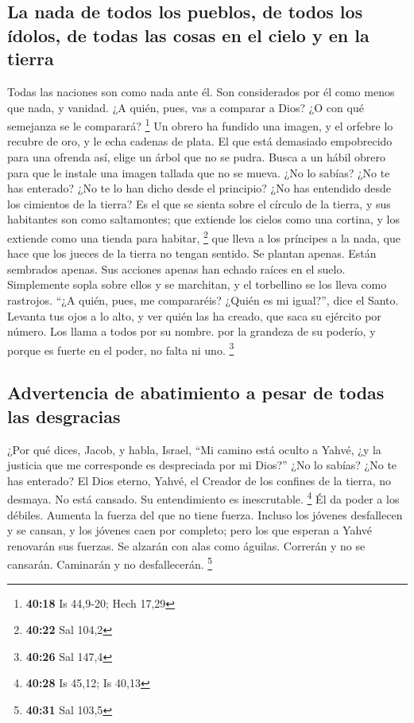 \hypertarget{la-nada-de-todos-los-pueblos-de-todos-los-uxeddolos-de-todas-las-cosas-en-el-cielo-y-en-la-tierra}{%
\subsection{La nada de todos los pueblos, de todos los ídolos, de todas
las cosas en el cielo y en la
tierra}\label{la-nada-de-todos-los-pueblos-de-todos-los-uxeddolos-de-todas-las-cosas-en-el-cielo-y-en-la-tierra}}

 Todas las naciones son como nada ante él. Son
considerados por él como menos que nada, y vanidad.  ¿A
quién, pues, vas a comparar a Dios? ¿O con qué semejanza se le
comparará? \footnote{\textbf{40:18} Is 44,9-20; Hech 17,29}
 Un obrero ha fundido una imagen, y el orfebre lo recubre
de oro, y le echa cadenas de plata.  El que está
demasiado empobrecido para una ofrenda así, elige un árbol que no se
pudra. Busca a un hábil obrero para que le instale una imagen tallada
que no se mueva.  ¿No lo sabías? ¿No te has enterado? ¿No
te lo han dicho desde el principio? ¿No has entendido desde los
cimientos de la tierra?  Es el que se sienta sobre el
círculo de la tierra, y sus habitantes son como saltamontes; que
extiende los cielos como una cortina, y los extiende como una tienda
para habitar, \footnote{\textbf{40:22} Sal 104,2}  que
lleva a los príncipes a la nada, que hace que los jueces de la tierra no
tengan sentido.  Se plantan apenas. Están sembrados
apenas. Sus acciones apenas han echado raíces en el suelo. Simplemente
sopla sobre ellos y se marchitan, y el torbellino se los lleva como
rastrojos.  ``¿A quién, pues, me compararéis? ¿Quién es
mi igual?'', dice el Santo.  Levanta tus ojos a lo alto,
y ver quién las ha creado, que saca su ejército por número. Los llama a
todos por su nombre. por la grandeza de su poderío, y porque es fuerte
en el poder, no falta ni uno. \footnote{\textbf{40:26} Sal 147,4}

\hypertarget{advertencia-de-abatimiento-a-pesar-de-todas-las-desgracias}{%
\subsection{Advertencia de abatimiento a pesar de todas las
desgracias}\label{advertencia-de-abatimiento-a-pesar-de-todas-las-desgracias}}

 ¿Por qué dices, Jacob, y habla, Israel, ``Mi camino está
oculto a Yahvé, ¿y la justicia que me corresponde es despreciada por mi
Dios?''  ¿No lo sabías? ¿No te has enterado? El Dios
eterno, Yahvé, el Creador de los confines de la tierra, no desmaya. No
está cansado. Su entendimiento es inescrutable. \footnote{\textbf{40:28}
  Is 45,12; Is 40,13}  Él da poder a los débiles. Aumenta
la fuerza del que no tiene fuerza.  Incluso los jóvenes
desfallecen y se cansan, y los jóvenes caen por completo;
 pero los que esperan a Yahvé renovarán sus fuerzas. Se
alzarán con alas como águilas. Correrán y no se cansarán. Caminarán y no
desfallecerán. \footnote{\textbf{40:31} Sal 103,5}

